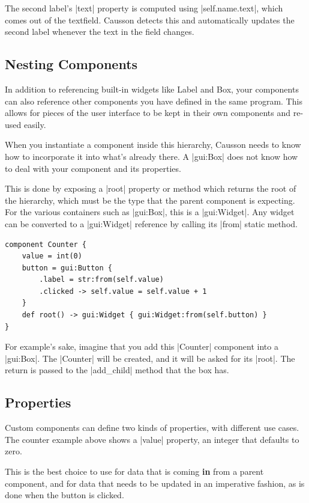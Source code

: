 \documentclass[11pt]{report}
\begin{document}
The second label's |text| property is computed using |self.name.text|, which comes out of the textfield. Causson detects this and automatically updates the second label whenever the text in the field changes.

\subsection{Nesting Components}\label{guideSecNesting}

In addition to referencing built-in widgets like Label and Box, your components can also reference other components you have defined in the same program. This allows for pieces of the user interface to be kept in their own components and re-used easily.

When you instantiate a component inside this hierarchy, Causson needs to know how to incorporate it into what's already there. A |gui:Box| does not know how to deal with your component and its properties.

This is done by exposing a |root| property or method which returns the root of the hierarchy, which must be the type that the parent component is expecting. For the various containers such as |gui:Box|, this is a |gui:Widget|. Any widget can be converted to a |gui:Widget| reference by calling its |from| static method.

\vspace{0.5cm}

\begin{Verbatim}[commandchars=^$&]
component Counter {
    value = int(0)
    button = gui:Button {
        .label = str:from(self.value)
        .clicked -> self.value = self.value + 1
    }
    def root() -> gui:Widget { gui:Widget:from(self.button) }
}
\end{Verbatim}

For example's sake, imagine that you add this |Counter| component into a |gui:Box|. The |Counter| will be created, and it will be asked for its |root|. The return is passed to the |add_child| method that the box has.

\subsection{Properties}

Custom components can define two kinds of properties, with different use cases. The counter example above shows a |value| property, an integer that defaults to zero.

This is the best choice to use for data that is coming \textbf{in} from a parent component, and for data that needs to be updated in an imperative fashion, as is done when the button is clicked.
\end{document}
